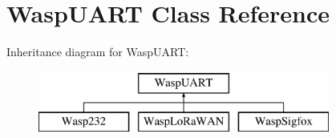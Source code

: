 \hypertarget{class_wasp_u_a_r_t}{}\section{Wasp\+U\+A\+RT Class Reference}
\label{class_wasp_u_a_r_t}
Inheritance diagram for Wasp\+U\+A\+RT\+:\begin{figure}[H]
\begin{center}
\leavevmode
\includegraphics[height=2.000000cm]{class_wasp_u_a_r_t}
\end{center}
\end{figure}
